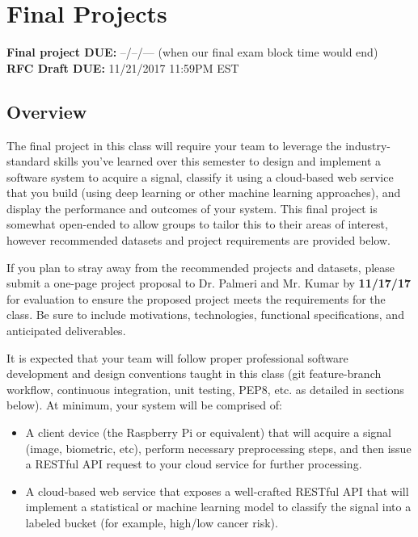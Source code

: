 
\usepackage{hyperref}



\section*{Final Projects}
{\bf Final project DUE:} --/--/--- (when our final exam block time would end) \\
{\bf RFC Draft DUE:} 11/21/2017 11:59PM EST 

\subsection*{Overview}
The final project in this class will require your team to leverage the industry-standard skills you've learned over this semester to design and implement a software system to acquire a signal, classify it using a cloud-based web service that you build (using deep learning or other machine learning approaches), and display the performance and outcomes of your system. This final project is somewhat open-ended to allow groups to tailor this to their areas of interest, however recommended datasets and project requirements are provided below. 

If you plan to stray away from the recommended projects and datasets, please submit a one-page project proposal to Dr. Palmeri and Mr. Kumar by {\bf 11/17/17} for evaluation to ensure the proposed project meets the requirements for the class. Be sure to include motivations, technologies, functional specifications, and anticipated deliverables.

It is expected that your team will follow proper professional software development and design conventions taught in this class (git feature-branch workflow, continuous integration, unit testing, PEP8, etc. as detailed in sections below). At minimum, your system will be comprised of:

\begin{itemize}
	\item A client device (the Raspberry Pi or equivalent) that will acquire a signal (image, biometric, etc), perform necessary preprocessing steps, and then issue a RESTful API request to your cloud service for further processing.
	\item A cloud-based web service that exposes a well-crafted RESTful API that will implement a statistical or machine learning model to classify the signal into a labeled bucket (for example, high/low cancer risk).
\end{itemize}

